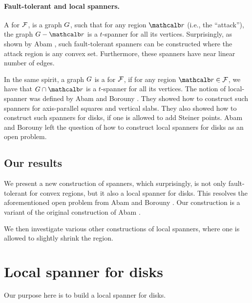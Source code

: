 \documentclass[12pt]{article}%
\begin{document}
\paragraph{Fault-tolerant and local spanners.}

A  for $\mathcal{F}$, is a graph $G$, such that
for any region $\region$ (i.e., the ``attack''), the graph
$\G \gminus \region$ is a $t$-spanner for all its
vertices. Surprisingly, as shown by Abam \etal \cite{abfg-rftgs-09},
such fault-tolerant spanners can be constructed where the attack
region is any convex set. Furthermore, these spanners have near linear
number of edges.

In the same spirit, a graph $G$ is a  for $\mathcal{F}$,
if for any region $\region \in \FF$, we have that
$\restrictY{\G}{\region}$ is a $t$-spanner for all its vertices.  The
notion of local-spanner was defined by Abam and Borouny
\cite{ab-lgs-21}. They showed how to construct such spanners for
axis-parallel squares and vertical slabs. They also showed how to
construct such spanners for disks, if one is allowed to add Steiner
points. Abam and Borouny left the question of how to construct local
spanners for disks as an open problem.

\subsection*{Our results}

We present a new construction of spanners, which surprisingly, is not
only fault-tolerant for convex regions, but it also a local spanner
for disks. This resolves the aforementioned open problem from Abam and
Borouny \cite{ab-lgs-21}. Our construction is a variant of the
original construction of Abam \etal \cite{abfg-rftgs-09}.

We then investigate various other constructions of local spanners,
where one is allowed to slightly shrink the region.
	
	
	
	
\section{Local spanner for disks}

Our purpose here is to build a local spanner for disks.
\end{document}

